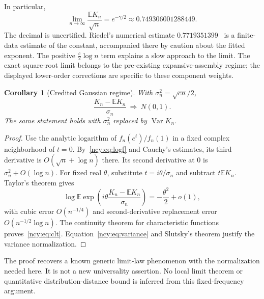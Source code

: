 \documentclass[11pt,letterpaper]{article}
\numberwithin{equation}{section}
\newtheorem{corollary}[theorem]{Corollary}
\theoremstyle{remark}\newtheorem{remark}[theorem]{Remark}
\newcommand{\EE}{\mathbb E}
\newcommand{\Var}{\operatorname{Var}}
\theoremstyle{definition}\newtheorem{definition}[theorem]{Definition}\theoremstyle{plain}
\begin{document}
In particular,
\begin{equation}\label{ncy:eq:meanlimit}
 \lim_{n\to\infty}\frac{\EE K_n}{\sqrt n}
       =e^{-\gamma/2}\approx0.749306001288449.
\end{equation}
The decimal is uncertified. Riedel's numerical estimate
$0.7719351399$~\cite[p. 3]{riedel} is a finite-data estimate of the
constant, accompanied there by caution about the fitted exponent.
The positive $\frac c2\log n$ term explains a slow approach to the
limit. The exact square-root limit belongs to the pre-existing
expansive-assembly regime; the displayed lower-order corrections are
specific to these component weights.

\begin{corollary}[Credited Gaussian regime]\label{ncy:cor:clt}
With $\sigma_n^2=\sqrt{cn}/2$,
\begin{equation}\label{ncy:eq:clt}
 \frac{K_n-\EE K_n}{\sigma_n}\ \Longrightarrow\ N(0,1).
\end{equation}
The same statement holds with $\sigma_n^2$ replaced by $\Var K_n$.
\end{corollary}
\begin{proof}
Use the analytic logarithm of $f_n(e^t)/f_n(1)$ in a fixed complex
neighborhood of $t=0$. By~\eqref{ncy:eq:logf} and Cauchy's estimates,
its third derivative is $O(\sqrt n+\log n)$ there. Its second derivative
at $0$ is $\sigma_n^2+O(\log n)$. For fixed real $\theta$, substitute
$t=i\theta/\sigma_n$ and subtract $t\EE K_n$. Taylor's theorem gives
\[
 \log\EE\exp\left(i\theta\frac{K_n-\EE K_n}{\sigma_n}\right)
 =-\frac{\theta^2}{2}+o(1),
\]
with cubic error $O(n^{-1/4})$ and second-derivative replacement error
$O(n^{-1/2}\log n)$. The continuity theorem for characteristic
functions proves~\eqref{ncy:eq:clt}. Equation~\eqref{ncy:eq:variance} and
Slutsky's theorem justify the variance normalization.
\end{proof}

The proof recovers a known generic limit-law phenomenon with the
normalization needed here. It is not a new universality assertion.
No local limit theorem or quantitative distribution-distance bound
is inferred from this fixed-frequency argument.
\end{document}
